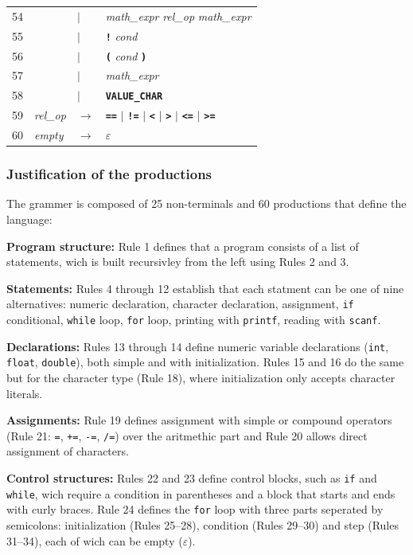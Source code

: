 \documentclass[letterpaper,12pt,oneside]{article}
\begin{document}
\begin{longtable}{c p{2.8cm} p{0.5cm} p{9cm}}
54 & & $|$ & \textit{math\_expr} \; \textit{rel\_op} \; \textit{math\_expr} \\
55 & & $|$ & \textbf{\texttt{!}} \; \textit{cond} \\
56 & & $|$ & \textbf{\texttt{(}} \; \textit{cond} \; \textbf{\texttt{)}} \\
57 & & $|$ & \textit{math\_expr} \\
58 & & $|$ & \textbf{\texttt{VALUE\_CHAR}} \\[4pt]
59 & \textit{rel\_op} & $\rightarrow$ & \textbf{\texttt{==}} \; $|$ \; \textbf{\texttt{!=}} \; $|$ \; \textbf{\texttt{<}} \; $|$ \; \textbf{\texttt{>}} \; $|$ \; \textbf{\texttt{<=}} \; $|$ \; \textbf{\texttt{>=}} \\[4pt]
60 & \textit{empty} & $\rightarrow$ & $\varepsilon$ \\
\hline
\end{longtable}

\subsubsection{Justification of the productions}

The grammer is composed of 25 non-terminals and 60 productions that define the language:
\vspace{0.5cm}

\textbf{Program structure:} Rule 1 defines that a program consists of a list of statements, wich is built recursivley from the left using Rules 2 and 3.

\textbf{Statements:} Rules 4 through 12 establish that each statment can be one of nine alternatives: numeric declaration, character declaration, assignment, \texttt{if} conditional, \texttt{while} loop, \texttt{for} loop, printing with \texttt{printf}, reading with \texttt{scanf}.

\textbf{Declarations:} Rules 13 through 14 define numeric variable declarations (\texttt{int}, \texttt{float}, \texttt{double}), both simple and with initialization. Rules 15 and 16 do the same but for the character type (Rule 18), where initialization only accepts character literals.

\textbf{Assignments:} Rule 19 defines assignment with simple or compound operators (Rule 21: \texttt{=}, \texttt{+=}, \texttt{-=}, \texttt{/=}) over the aritmethic part and Rule 20 allows direct assignment of characters.

\textbf{Control structures:} Rules 22 and 23 define control blocks, such as \texttt{if} and \texttt{while}, wich require a condition in parentheses and a block that starts and ends with curly braces. Rule 24 defines the \texttt{for} loop with three parts seperated by semicolons: initialization (Rules 25--28), condition (Rules 29--30) and step (Rules 31--34), each of wich can be empty ($\varepsilon$).
\end{document}
